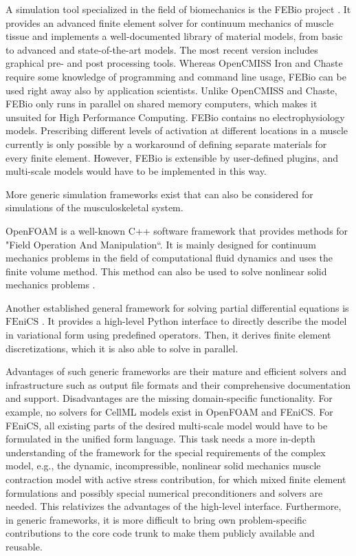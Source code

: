 A simulation tool specialized in the field of biomechanics is the FEBio project \cite{Maas2012,maas2017febio}. It provides an advanced finite element solver for continuum mechanics of muscle tissue and implements a well-documented library of material models, from basic to advanced and state-of-the-art models. The most recent version includes graphical pre- and post processing tools. Whereas OpenCMISS Iron and Chaste require some knowledge of programming and command line usage, FEBio can be used right away also by application scientists. 
Unlike OpenCMISS and Chaste, FEBio only runs in parallel on shared memory computers, which makes it unsuited for High Performance Computing. FEBio contains no electrophysiology models. Prescribing different levels of activation at different locations in a muscle currently is only possible by a workaround of defining separate materials for every finite element. However, FEBio is extensible by user-defined plugins, and multi-scale models would have to be implemented in this way.

More generic simulation frameworks exist that can also be considered for simulations of the musculoskeletal system.

OpenFOAM \cite{jasak2007openfoam} is a well-known C++ software framework that provides methods for "Field Operation And Manipulation``. It is mainly designed for continuum mechanics problems in the field of computational fluid dynamics and uses the finite volume method. This method can also be used to solve nonlinear solid mechanics problems \cite{cardiff2014nonlinear}.

Another established general framework for solving partial differential equations is $\text{FEniCS}$ \cite{alnaes2015fenics}. It provides a high-level Python interface to directly describe the model in variational form using predefined operators. Then, it derives finite element discretizations, which it is also able to solve in parallel.

Advantages of such generic frameworks are their mature and efficient solvers and infrastructure such as output file formats and their comprehensive documentation and support. Disadvantages are the missing domain-specific functionality. For example, no solvers for CellML models exist in OpenFOAM and FEniCS. For FEniCS, all existing parts of the desired multi-scale model would have to be formulated in the unified form language. This task needs a more in-depth understanding of the framework for the special requirements of the complex model, e.g., the dynamic, incompressible, nonlinear solid mechanics muscle contraction model with active stress contribution, for which mixed finite element formulations and possibly special numerical preconditioners and solvers are needed. This relativizes the advantages of the high-level interface.
Furthermore, in generic frameworks, it is more difficult to bring own problem-specific contributions to the core code trunk to make them publicly available and reusable.

